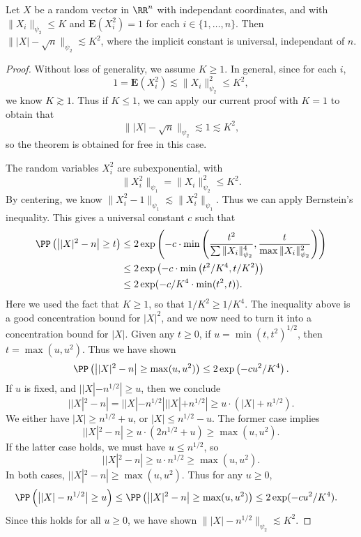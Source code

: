 \begin{theorem} \label{concentrationNorm}
    Let $X$ be a random vector in $\RR^n$ with independant coordinates, and with $\| X_i \|_{\psi_2} \leq K$ and $\mathbf{E}(X_i^2) = 1$ for each $i \in \{ 1, \dots, n \}$. Then $\| |X| - \sqrt{n} \|_{\psi_2} \lesssim K^2$, where the implicit constant is universal, independant of $n$.
\end{theorem}
\begin{proof}
	Without loss of generality, we assume $K \geq 1$. In general, since for each $i$,
    \[ 1 = \mathbf{E}(X_i^2) \lesssim \| X_i \|_{\psi_2}^2 \leq K^2, \]
    we know $K \gtrsim 1$. Thus if $K \leq 1$, we can apply our current proof with $K = 1$ to obtain that
    \[ \| |X| - \sqrt{n} \|_{\psi_2} \lesssim 1 \lesssim K^2, \]
    so the theorem is obtained for free in this case.

    The random variables $X_i^2$ are subexponential, with
    \[ \| X_i^2 \|_{\psi_1} = \| X_i \|_{\psi_2}^2 \leq K^2. \]
    By centering, we know $\| X_i^2 - 1 \|_{\psi_1} \lesssim \| X_i^2 \|_{\psi_1}$. Thus we can apply Bernstein's inequality. This gives a universal constant $c$ such that
    \begin{align*}
        \PP \left( \big||X|^2 - n \big| \geq t \right) &\leq 2 \exp \left( -c \cdot \min \left( \frac{t^2}{\sum \| X_i \|_{\psi_2}^4}, \frac{t}{\max \| X_i \|_{\psi_2}^2} \right) \right)\\
        &\leq 2 \exp \left( -c \cdot \min \left( t^2 / K^4 , t/K^2 \right) \right)\\
        &\leq 2 \exp(- c/K^4 \cdot \min(t^2,t)).
    \end{align*}
    Here we used the fact that $K \geq 1$, so that $1/K^2 \geq 1/K^4$. The inequality above is a good concentration bound for $|X|^2$, and we now need to turn it into a concentration bound for $|X|$. Given any $t \geq 0$, if $u = \min(t,t^2)^{1/2}$, then $t = \max(u,u^2)$. Thus we have shown
    \[ \PP \left( \big||X|^2 - n \big| \geq \max(u,u^2) \right) \leq 2 \exp \left( - cu^2/K^4 \right). \]
    If $u$ is fixed, and $||X| - n^{1/2}| \geq u$, then we conclude
    \[ ||X|^2 - n| = ||X| - n^{1/2}|||X| + n^{1/2}| \geq u \cdot (|X| + n^{1/2}). \]
    We either have $|X| \geq n^{1/2} + u$, or $|X| \leq n^{1/2} - u$. The former case implies
    \[ ||X|^2 - n| \geq u \cdot (2n^{1/2} + u) \geq \max(u,u^2). \]
    If the latter case holds, we must have $u \leq n^{1/2}$, so
    \[ ||X|^2 - n| \geq u \cdot n^{1/2} \geq \max(u,u^2). \]
    In both cases, $||X|^2 - n| \geq \max(u,u^2)$. Thus for any $u \geq 0$,
    \begin{align*}
        \PP \left( \big| |X| - n^{1/2} \big| \geq u \right) &\leq \PP \left( \big| |X|^2 - n \big| \geq \max(u,u^2) \right) \leq 2 \exp(-cu^2/K^4).
    \end{align*}
    Since this holds for all $u \geq 0$, we have shown $\| |X| - n^{1/2} \|_{\psi_2} \lesssim K^2$.
\end{proof}

